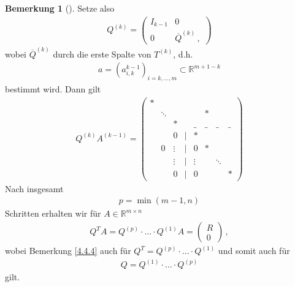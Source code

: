 \documentclass[ngerman,fontsize=11pt, paper=a4, parskip=half, titlepage=true, toc=bib]{scrbook}
\theoremstyle{definition}
\newtheorem{Bem}[Def]{Bemerkung}	%
\theoremstyle{plain}
\newcommand{\R}{\mathds{R}}
\newenvironment{Beme}[1][]{ %
  \begin{Bem}[#1]
  }
  {
  \end{Bem}
  \addtocounter{subsection}{1}
}
\begin{document}
\begin{Beme}
  Setze also
  \begin{gather}
    Q^{(k)} = \begin{pmatrix}
      I_{k-1} & 0 \\
      0 & \overline{Q}^{(k)} \, ,
      \label{IV.4.13}
    \end{pmatrix}
  \end{gather}
  wobei $\overline{Q}^{(k)} $ durch die erste Spalte von $T^{(k)}$, d.h.
  \begin{gather}
    a= (a_{i,k}^{k-1})_{i=k,\dotsc, m} \subset \R^{m+1-k}
    \label{IV.4.14}
  \end{gather}
  bestimmt wird. Dann gilt
  \begin{gather*}
    Q^{(k)}A^{(k-1)} =
    \begin{pmatrix}
      *  &&&&&\\
      &\ddots &&&& * \\
      &&*&&\_&\_&\_&\_ \\
      &&0&|&* \\
      &0&\vdots&|&0&* \\
      &&\vdots&  |&\vdots &&\ddots\\
      &&0&  |&0&&&*
    \end{pmatrix}
  \end{gather*}
  Nach insgesamt 
  \begin{gather}
    p=\min (m-1, n)
    \label{IV.4.15}
  \end{gather}
  Schritten erhalten wir für $A\in \R^{m\times n}$
  \begin{gather}
    Q^TA = Q^{(p)}\cdot \dotsc \cdot Q^{(1)}A 
    = \begin{pmatrix} R\\0\end{pmatrix}\, ,
  \end{gather}
  wobei Bemerkung \ref{4.4.4} auch für 
  $Q^T= Q^{(p)}\cdot \dotsc \cdot Q^{(1)} $ und somit auch für
  \begin{gather}
    Q = Q^{(1)}\cdot \dotsc \cdot Q^{(p)}
    \label{IV.4.16}
  \end{gather}
  gilt.
\end{Beme}



\end{document}
